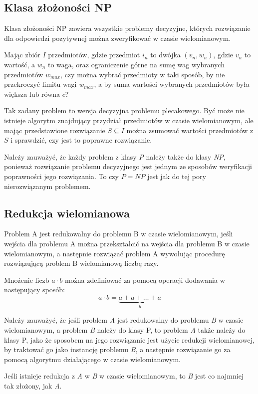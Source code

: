 \subsection{Klasa złożoności NP}
\begin{definition}
    Klasa złożoności NP zawiera wszystkie problemy decyzyjne, których rozwiązanie dla odpowiedzi pozytywnej
można zweryfikować w czasie wielomianowym.
\end{definition}
\begin{example}
    Mając zbiór $I$ przedmiotów, gdzie przedmiot $i_n$ to dwójka $(v_n, w_n)$, gdzie $v_n$ to wartość,
a $w_n$ to waga, oraz ograniczenie górne na sumę wag wybranych przedmiotów $w_{max}$, czy można
wybrać przedmioty w taki sposób, by nie przekroczyć limitu wagi $w_{max}$, a by suma wartości
wybranych przedmiotów była większa lub równa $c$?

    Tak zadany problem to wersja decyzyjna problemu plecakowego. Być może nie istnieje algorytm znajdujący
przydział przedmiotów w czasie wielomianowym, ale mając przedstawione rozwiązanie $S \subseteq I$
można zsumować wartości przedmiotów z $S$ i sprawdzić, czy jest to poprawne rozwiązanie.
\end{example}

    Należy zauważyć, że każdy problem z klasy \textit{P} należy także do klasy \textit{NP}, ponieważ
rozwiązanie problemu decyzyjnego jest jednym ze sposobów weryfikacji poprawności jego rozwiązania.
To czy $P = NP$ jest jak do tej pory nierozwiązanym problemem.


\subsection{Redukcja wielomianowa}
\begin{definition}
    Problem A jest redukowalny do problemu B w czasie wielomianowym, jeśli wejścia dla problemu A
można przekształcić na wejścia dla problemu B w czasie wielomianowym, a następnie rozwiązać problem A
wywołując procedurę rozwiązującą problem B wielomianową liczbę razy.
\end{definition}
\begin{example}
    Mnożenie liczb $a \cdot b$ można zdefiniować za pomocą operacji dodawania w następujący sposób:
$$a \cdot b = \underbrace{a + a + \ldots + a}_{b}$$
\end{example}
    Należy zauważyć, że jeśli problem \textit{A} jest redukowalny do problemu \textit{B} w czasie wielomianowym,
a problem \textit{B} należy do klasy P, to problem \textit{A} także należy do klasy P, jako że
sposobem na jego rozwiązanie jest użycie redukcji wielomianowej, by traktować go jako instancję problemu \textit{B},
a następnie rozwiązanie go za pomocą algorytmu działającego w czasie wielomianowym.
\begin{corollary}
    Jeśli istnieje redukcja z \textit{A} w \textit{B} w czasie wielomianowym, to \textit{B} jest
co najmniej tak złożony, jak \textit{A}.
\end{corollary}


